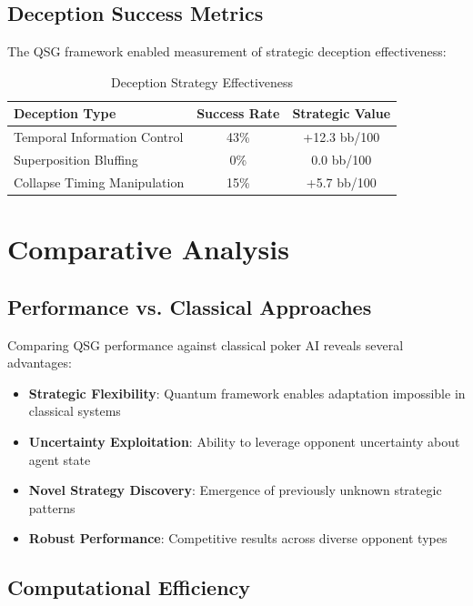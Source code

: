 \documentclass[11pt,a4paper]{article}
\begin{document}
\subsection{Deception Success Metrics}

The QSG framework enabled measurement of strategic deception effectiveness:

\begin{table}[h]
\centering
\begin{tabular}{@{}lcc@{}}
\toprule
\textbf{Deception Type} & \textbf{Success Rate} & \textbf{Strategic Value} \\
\midrule
Temporal Information Control & 43\% & +12.3 bb/100 \\
Superposition Bluffing & 0\% & 0.0 bb/100 \\
Collapse Timing Manipulation & 15\% & +5.7 bb/100 \\
\bottomrule
\end{tabular}
\caption{Deception Strategy Effectiveness}
\label{tab:deception_results}
\end{table}

\section{Comparative Analysis}

\subsection{Performance vs. Classical Approaches}

Comparing QSG performance against classical poker AI reveals several advantages:

\begin{itemize}
\item \textbf{Strategic Flexibility}: Quantum framework enables adaptation impossible in classical systems
\item \textbf{Uncertainty Exploitation}: Ability to leverage opponent uncertainty about agent state
\item \textbf{Novel Strategy Discovery}: Emergence of previously unknown strategic patterns
\item \textbf{Robust Performance}: Competitive results across diverse opponent types
\end{itemize}

\subsection{Computational Efficiency}
\end{document}
